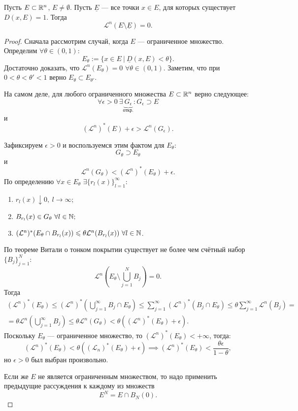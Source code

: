 \begin{theorem}
    Пусть $E \subset \mathbb{R}^n$, $E \neq \emptyset$.
    Пусть $\underline{E}$ — все точки $x \in E$, для которых существует $D(x,E) = 1$.
    Тогда $$\mathcal{L}^n (E \setminus \underline{E}) = 0.$$
\end{theorem} 
\begin{proof}
    Сначала рассмотрим случай, когда $E$ — ограниченное множество.
    Определим $\forall \theta \in (0,1):$
    \[E_\theta := \{x \in E \ | \ \underline{D}(x,E) < \theta\}.\]
    Достаточно доказать, что $\mathcal{L}^n (E_\theta) = 0$ $\forall \theta \in (0,1)$.
    Заметим, что при $0 < \theta < \theta' < 1$ верно $E_{\theta} \subset E_{\theta'}$.

    На самом деле, для любого ограниченного множества $E \subset \mathbb{R}^n$ верно следующее:
    \[\forall \epsilon > 0 \ \exists \underbrace{G_\epsilon}_{\text{откр.}}: G_\epsilon \supset E\]
    и
    \[(\mathcal{L}^n)^*(E) + \epsilon > \mathcal{L}^n (G_\epsilon).\]

    \noindent Зафиксируем $\epsilon > 0$ и воспользуемся этим фактом для $E_\theta$:
    \[G_\theta \supset E_\theta\]
    и
    \[\mathcal{L}^n(G_\theta) < (\mathcal{L}^n)^*(E_\theta) + \epsilon.\]
    По определению $\forall x \in E_\theta$ $\exists \{r_l(x)\}_{l=1}^\infty:$
    \begin{enumerate}
        \item $r_l(x) \downarrow 0, \ l \to \infty;$
        \item $B_{r_l}(x) \in G_\theta \ \forall l \in \mathbb{N};$
        \item $(\mathcal{L}^n)^*(E_\theta \cap B_{r_l}(x)) \leqslant \theta \mathcal{L}^n(B_{r_l}(x)) \ \forall l \in \mathbb{N}$.
    \end{enumerate}
    По теореме Витали о тонком покрытии существует не более чем счётный набор $\{B_j\}_{j=1}^N:$
    \[\mathcal{L}^n \left(E_\theta \setminus \bigcup\limits_{j=1}^{N}B_j\right) = 0.\]
    Тогда
    \begin{multline*}
        (\mathcal{L}^n)^*(E_\theta)
        \leqslant
        (\mathcal{L}^n)^* \left(\bigcup\limits_{j=1}^{\infty}B_j \cap E_\theta\right)
        \leqslant
        \sum\limits_{j=1}^{\infty} (\mathcal{L}^n)^*(B_j \cap E_\theta)
        \leqslant
        \theta \sum\limits_{j=1}^{\infty} \mathcal{L}^n(B_j)
        =\\=
        \theta \mathcal{L}^n \left(\bigcup\limits_{j=1}^{\infty}B_j\right)
        \leqslant
        \theta \mathcal{L}^n (G_\theta)
        <
        \theta ((\mathcal{L}^n)^*(E_\theta) + \epsilon).
    \end{multline*} 
    Поскольку $E_\theta$ — ограниченное множество, то
    $(\mathcal{L}^n)^*(E_\theta) < + \infty$, тогда:
    \[(\mathcal{L}^n)^*(E_\theta) < \theta ((\mathcal{L}_n)^*(E_\theta) + \epsilon)
    \implies
    (\mathcal{L}^n)^*(E_\theta) < \frac{\theta \epsilon}{1 - \theta},\]
    но $\epsilon > 0$ был выбран произвольно.

    Если же $E$ не является ограниченным множеством, то надо применить предыдущие рассуждения к каждому из множеств
    \[E^N = E \cap B_N(0).\]
\end{proof} 

